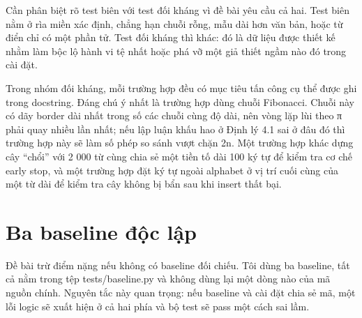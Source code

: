 Cần phân biệt rõ test biên với test đối kháng vì đề bài yêu cầu cả hai.
Test biên nằm ở rìa miền xác định, chẳng hạn chuỗi rỗng, mẫu dài hơn văn
bản, hoặc từ điển chỉ có một phần tử. Test đối kháng thì khác: đó là dữ
liệu được thiết kế nhằm làm bộc lộ hành vi tệ nhất hoặc phá vỡ một giả
thiết ngầm nào đó trong cài đặt.

Trong nhóm đối kháng, mỗi trường hợp đều có mục tiêu tấn công cụ thể
được ghi trong docstring. Đáng chú ý nhất là trường hợp dùng chuỗi
Fibonacci. Chuỗi này có dãy border dài nhất trong số các chuỗi cùng độ
dài, nên vòng lặp lùi theo π phải quay nhiều lần nhất; nếu lập luận khấu
hao ở Định lý 4.1 sai ở đâu đó thì trường hợp này sẽ làm số phép so sánh
vượt chặn 2n. Một trường hợp khác dựng cây ``chổi'' với 2 000 từ cùng
chia sẻ một tiền tố dài 100 ký tự để kiểm tra cơ chế early stop, và một
trường hợp đặt ký tự ngoài alphabet ở vị trí cuối cùng của một từ dài để
kiểm tra cây không bị bẩn sau khi insert thất bại.

\section{Ba baseline độc lập}
\label{sec:6-2}

Đề bài trừ điểm nặng nếu không có baseline đối chiếu. Tôi dùng ba
baseline, tất cả nằm trong tệp tests/baseline.py và không dùng lại một
dòng nào của mã nguồn chính. Nguyên tắc này quan trọng: nếu baseline và
cài đặt chia sẻ mã, một lỗi logic sẽ xuất hiện ở cả hai phía và bộ test
sẽ pass một cách sai lầm.

\begin{center}
\end{center}

